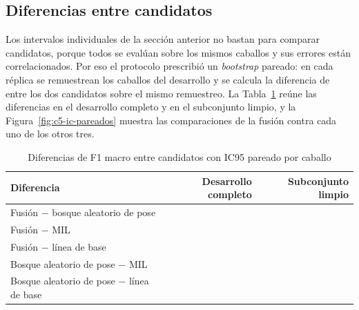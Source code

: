 \subsection{Diferencias entre candidatos}
Los intervalos individuales de la sección anterior no bastan para comparar candidatos, porque todos se evalúan sobre los mismos caballos y sus errores están correlacionados. Por eso el protocolo prescribió un \textit{bootstrap} pareado: en cada réplica se remuestrean los caballos del desarrollo y se calcula la diferencia de \fmacro{} entre los dos candidatos sobre el mismo remuestreo. La Tabla~\ref{tab:c5-pareadas} reúne las diferencias en el desarrollo completo y en el subconjunto limpio, y la Figura~\ref{fig:c5-ic-pareados} muestra las comparaciones de la fusión contra cada uno de los otros tres.

\begin{table}[H]
\caption{Diferencias de F1 macro entre candidatos con IC95 pareado por caballo}\label{tab:c5-pareadas}
{\singlespacing\small
\begin{tabular}{@{}lrr@{}}
\toprule
Diferencia & Desarrollo completo & Subconjunto limpio \\
\midrule
Fusión $-$ bosque aleatorio de pose & \DifFusionRFDev{} \DifFusionRFDevIC{} & \DifFusionRFLimpio{} \DifFusionRFLimpioIC{} \\
Fusión $-$ MIL & \DifFusionMILDev{} \DifFusionMILDevIC{} & \DifFusionMILLimpio{} \DifFusionMILLimpioIC{} \\
Fusión $-$ línea de base & \DifFusionBaseDev{} \DifFusionBaseDevIC{} & \DifFusionBaseLimpio{} \DifFusionBaseLimpioIC{} \\
Bosque aleatorio de pose $-$ MIL & \DifRFMILDev{} \DifRFMILDevIC{} & \DifRFMILLimpio{} \DifRFMILLimpioIC{} \\
Bosque aleatorio de pose $-$ línea de base & \DifRFBaseDev{} \DifRFBaseDevIC{} & \DifRFBaseLimpio{} \DifRFBaseLimpioIC{} \\
\bottomrule
\end{tabular}}
\end{table}


